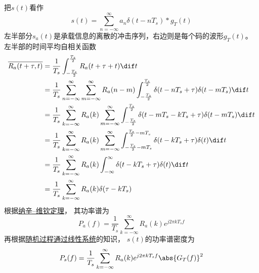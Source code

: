     把$s(t)$看作
    \begin{equation*}
        s(t)=\sum_{n=-\infty}^{\infty}a_n\delta(t-nT_s)*g_T(t)
    \end{equation*}
    左半部分$s_a(t)$是承载信息的离散的冲击序列，右边则是每个码的波形$g_T(t)$。
    左半部的时间平均自相关函数
    \begin{equation*}
        \begin{split}
            \overline{R_a(t+\tau,t)}&=\frac{1}{T_s}\int_{-\frac{T_s}{2}}^{\frac{T_s}{2}}R_a(t+\tau+t)\dif t\\
                                    &=\frac{1}{T_s}\sum_{n=-\infty}^{\infty}\sum_{m=-\infty}^{\infty}R_a(n-m)\int_{-\frac{T_s}{2}}^{\frac{T_s}{2}}\delta(t-nT_s+\tau)\delta(t-mT_s)\dif t\\
                                    &=\frac{1}{T_s}\sum_{k=-\infty}^{\infty}R_a(k)\sum_{m=-\infty}^{\infty}\int_{-\frac{T_s}{2}}^{\frac{T_s}{2}}\delta(t-mT_s-kT_s+\tau)\delta(t-mT_s)\dif t\\
                                    &=\frac{1}{T_s}\sum_{k=-\infty}^{\infty}R_a(k)\sum_{m=-\infty}^{\infty}\int_{-\frac{T_s}{2}-mT_s}^{\frac{T_s}{2}-mT_s}\delta(t-kT_s+\tau)\delta(t)\dif t\\
                                    &=\frac{1}{T_s}\sum_{k=-\infty}^{\infty}R_a(k)\int_{-\infty}^{\infty}\delta(t-kT_s+\tau)\delta(t)\dif t\\
                                    &=\frac{1}{T_s}\sum_{k=-\infty}^{\infty}R_a(k)\delta(\tau-kT_s)
        \end{split}
    \end{equation*}
    根据\hyperref[thm:Wiener_Khinchin]{纳辛--维钦定理}，
    其功率谱为
    \begin{equation*}
        P_a(f)=\frac{1}{T_s}\sum_{k=-\infty}^{\infty}R_a(k)e^{j2\pi kT_sf}
    \end{equation*}
    再根据\hyperref[subsubsec:LITsystem]{随机过程通过线性系统}的知识，
    $s(t)$的功率谱密度为
    \begin{equation*}
        P_s(f)=\frac{1}{T_s}\sum_{k=-\infty}^{\infty}R_a(k)e^{j2\pi kT_sf}\abs{G_T(f)}^2
    \end{equation*}

